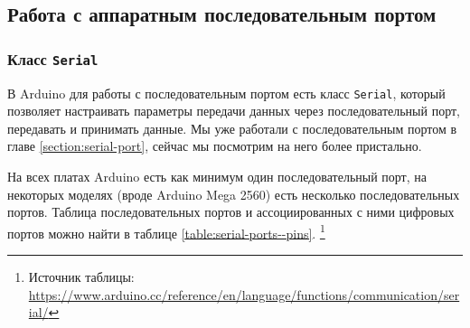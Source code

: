 \documentclass[../sparc.tex]{subfiles}
\begin{document}

\subsection{Работа с аппаратным последовательным портом}

\subsubsection{Класс \texttt{Serial}}

В Arduino для работы с последовательным портом есть класс \texttt{Serial},
который позволяет настраивать параметры передачи данных через последовательный
порт, передавать и принимать данные.  Мы уже работали с последовательным портом
в главе \ref{section:serial-port}, сейчас мы посмотрим на него более пристально.

На всех платах Arduino есть как минимум один последовательный порт, на некоторых
моделях (вроде Arduino Mega 2560) есть несколько последовательных портов.
Таблица последовательных портов и ассоциированных с ними цифровых портов можно
найти в таблице \ref{table:serial-ports--pins}. \footnote{Источник таблицы:
\url{https://www.arduino.cc/reference/en/language/functions/communication/serial/}}
\end{document}
